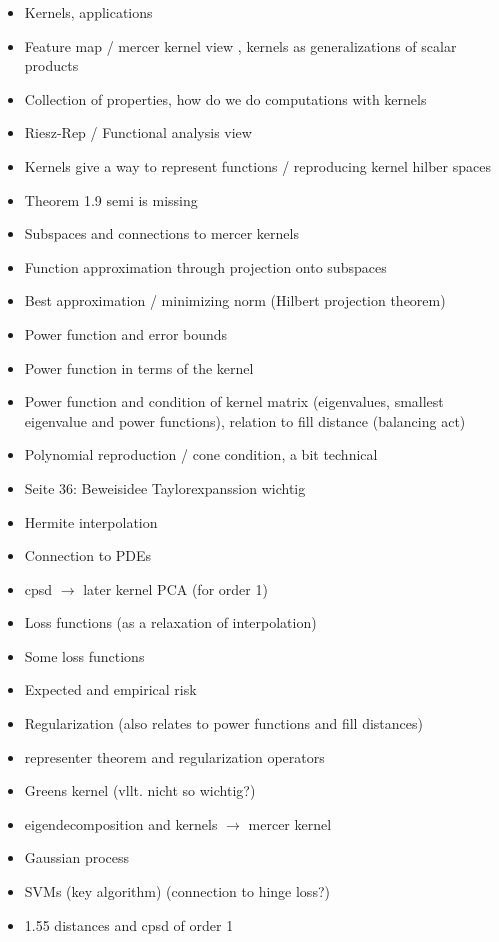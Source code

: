 \begin{itemize}
    \item Kernels, applications 
    \item Feature map / mercer kernel view , kernels as generalizations of scalar products
    \item Collection of properties, how do we do computations with kernels 
    \item Riesz-Rep / Functional analysis view 
    \item Kernels give a way to represent functions / reproducing kernel hilber spaces
    \item Theorem 1.9 semi is missing 
    \item Subspaces and connections to mercer kernels 
    \item Function approximation through projection onto subspaces 
    \item Best approximation / minimizing norm (Hilbert projection theorem)
    \item Power function and error bounds 
    \item Power function in terms of the kernel 
    \item Power function and condition of kernel matrix (eigenvalues, smallest eigenvalue and power functions), relation to fill distance (balancing act)
    \item Polynomial reproduction / cone condition, a bit technical
    \item Seite 36: Beweisidee Taylorexpanssion wichtig
    \item Hermite interpolation 
    \item Connection to PDEs
    \item cpsd $\to$ later kernel PCA (for order 1)
    \item Loss functions (as a relaxation of interpolation)
    \item Some loss functions
    \item Expected and empirical risk 
    \item Regularization (also relates to power functions and fill distances)
    \item representer theorem and regularization operators
    \item Greens kernel (vllt. nicht so wichtig?)
    \item eigendecomposition and kernels $\to$ mercer kernel
    \item Gaussian process 
    \item SVMs (key algorithm) (connection to hinge loss?)
    \item 1.55 distances and cpsd of order 1   
\end{itemize}


